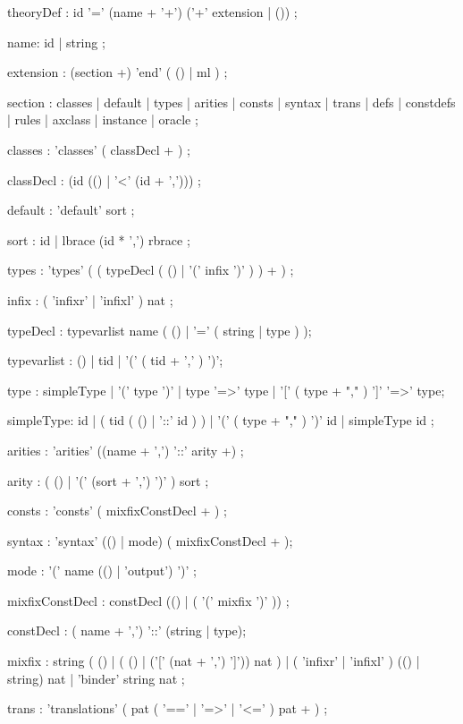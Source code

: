 \begin{rail}

theoryDef : id '=' (name + '+') ('+' extension | ())
          ;

name: id | string
    ;

extension : (section +) 'end' ( () | ml )
          ;

section : classes
        | default
        | types
        | arities
        | consts
        | syntax
        | trans
        | defs
        | constdefs
        | rules
        | axclass
        | instance
        | oracle
        ;

classes : 'classes' ( classDecl + )
        ;

classDecl : (id (() | '<' (id + ',')))
        ;

default : 'default' sort 
        ;

sort :  id
     | lbrace (id * ',') rbrace
     ;

types : 'types' ( ( typeDecl ( () | '(' infix ')' ) ) + )
      ;

infix : ( 'infixr' | 'infixl' ) nat
      ;

typeDecl : typevarlist name
           ( () | '=' ( string | type ) );

typevarlist : () | tid | '(' ( tid + ',' ) ')';

type : simpleType | '(' type ')' | type '=>' type |
       '[' ( type + "," ) ']' '=>' type;

simpleType: id | ( tid ( () | '::' id ) ) |
            '(' ( type + "," ) ')' id | simpleType id
          ;

arities : 'arities' ((name + ',') '::' arity +)
        ;

arity : ( () | '(' (sort + ',') ')' ) sort
      ;

consts : 'consts' ( mixfixConstDecl + )
       ;

syntax : 'syntax' (() | mode) ( mixfixConstDecl + );

mode : '(' name (() | 'output') ')'
     ;

mixfixConstDecl : constDecl (() | ( '(' mixfix ')' ))
                ;

constDecl : ( name + ',') '::' (string | type);

mixfix :  string ( () | ( () | ('[' (nat + ',') ']')) nat )
       | ( 'infixr' | 'infixl' ) (() | string) nat
       | 'binder' string nat ;

trans : 'translations' ( pat ( '==' | '=>' | '<=' ) pat + )
      ;


\end{rail}
